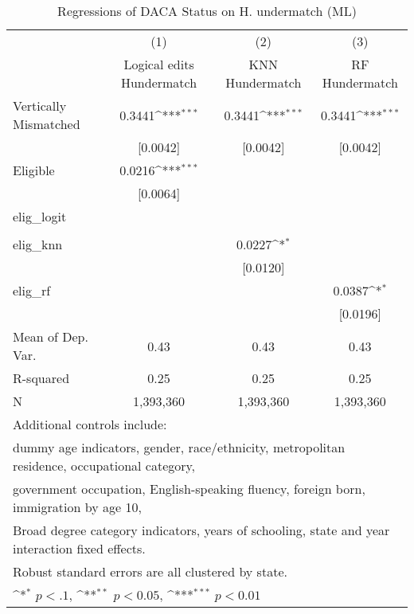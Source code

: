 \begin{table}[htbp]\centering
\def\sym#1{\ifmmode^{#1}\else\(^{#1}\)\fi}
\caption{Regressions of DACA Status on H. undermatch (ML)}
\begin{tabular}{l*{3}{c}}
\toprule
                    &\multicolumn{1}{c}{(1)}         &\multicolumn{1}{c}{(2)}         &\multicolumn{1}{c}{(3)}         \\
                    &Logical edits Hundermatch         &KNN Hundermatch         &RF Hundermatch         \\
\midrule
Vertically Mismatched&      0.3441\sym{***}&      0.3441\sym{***}&      0.3441\sym{***}\\
                    &    [0.0042]         &    [0.0042]         &    [0.0042]         \\
\addlinespace
Eligible            &      0.0216\sym{***}&                     &                     \\
                    &    [0.0064]         &                     &                     \\
\addlinespace
elig\_logit          &                     &                     &                     \\
                    &                     &                     &                     \\
\addlinespace
elig\_knn            &                     &      0.0227\sym{*}  &                     \\
                    &                     &    [0.0120]         &                     \\
\addlinespace
elig\_rf             &                     &                     &      0.0387\sym{*}  \\
                    &                     &                     &    [0.0196]         \\
\midrule
Mean of Dep. Var.   &        0.43         &        0.43         &        0.43         \\
R-squared           &        0.25         &        0.25         &        0.25         \\
N                   &   1,393,360         &   1,393,360         &   1,393,360         \\
\bottomrule
\multicolumn{4}{l}{\footnotesize Additional controls include:}\\
\multicolumn{4}{l}{\footnotesize dummy age indicators, gender, race/ethnicity, metropolitan residence, occupational category,}\\
\multicolumn{4}{l}{\footnotesize government occupation, English-speaking fluency, foreign born, immigration by age 10,}\\
\multicolumn{4}{l}{\footnotesize Broad degree category indicators, years of schooling, state and year interaction fixed effects.}\\
\multicolumn{4}{l}{\footnotesize Robust standard errors are all clustered by state.}\\
\multicolumn{4}{l}{\footnotesize \sym{*} \(p<.1\), \sym{**} \(p<0.05\), \sym{***} \(p<0.01\)}\\
\end{tabular}
\end{table}
